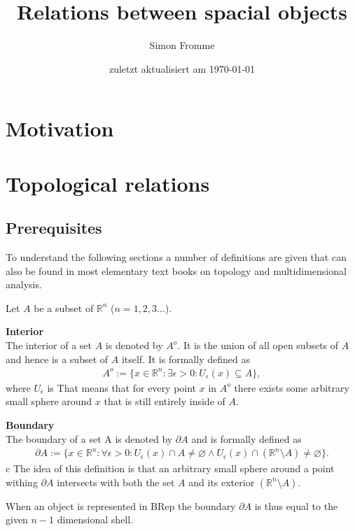 \documentclass[paper=a4, fontsize=11pt]{scrartcl} %
\title{Relations between spacial objects}
\author{Simon Fromme}
\date{\normalsize zuletzt aktualisiert am \today}
\numberwithin{equation}{section} %
\numberwithin{figure}{section} %
\numberwithin{table}{section} %
\begin{document}
\maketitle
\newpage


\section{Motivation}


\section{Topological relations}
\subsection{Prerequisites}

To understand the following sections a number of definitions are given that can also be found in most elementary text books on topology and multidimensional analysis.

Let $A$ be a subset of $\mathbb{R}^n$ ($n=1,2,3\dots$).

\textbf{Interior}\\
The interior of a set $A$ is denoted by $A^o$. It is the union of all open subsets of $A$ and hence is a subset of $A$ itself. It is formally defined as
\begin{align*}
  A^o := \{ x\in \mathbb{R}^n : \exists \epsilon > 0 : U_{\epsilon}(x) \subseteq A \},
\end{align*}
where $U_{\epsilon}$ is 
That means that for every point $x$ in $A^o$ there exists some arbitrary small sphere around $x$ that is still entirely inside of $A$. 

\textbf{Boundary} \\
The boundary of a set A is denoted by $\partial A$ and is formally defined as
\begin{align*}
  \partial A := \{ x \in \mathbb{R}^n : \forall \epsilon > 0 : U_{\epsilon}(x) \cap A \ne \varnothing \wedge U_{\epsilon}(x) \cap (\mathbb{R}^n \setminus A) \ne \varnothing    \}.
\end{align*}c
The idea of this definition is that an arbitrary small sphere around a point withing $\partial A$ intersects with both the set $A$ and its exterior $(\mathbb{R}^n \setminus A)$.

When an object is represented in BRep the boundary $\partial A$ is thus equal to the given $n-1$ dimensional shell.  
\end{document}
